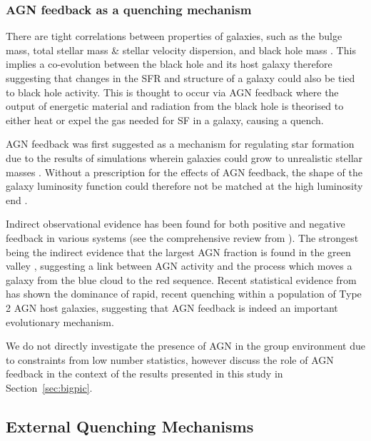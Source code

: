 \documentclass[useAMS,usenatbib]{mn2e}
\begin{document}
\subsubsection{AGN feedback as a quenching mechanism}\label{sec:agnquench}

There are tight correlations between properties of galaxies, such as the bulge mass, total stellar mass \& stellar velocity dispersion, and black hole mass \citep{magorrian98, marconi03, haringrix04}. This implies a co-evolution between the black hole and its host galaxy therefore suggesting that changes in the SFR and structure of a galaxy could also be tied to black hole activity. This is thought to occur via AGN feedback where the output of energetic material and radiation from the black hole is theorised to either heat or expel the gas needed for SF in a galaxy, causing a quench.

AGN feedback was first suggested as a mechanism for regulating star formation due to the results of simulations wherein galaxies could grow to unrealistic stellar masses \citep{silk98, Bower06, Croton06, somerville08}. Without a prescription for the effects of AGN feedback, the shape of the galaxy luminosity function could therefore not be matched at the high luminosity end \citep{baugh98, baugh05, kauffmann99a, kauffmann99b, somerville01, kitzbichler06}. 

Indirect observational evidence has been found for both positive and negative feedback in various systems (see the comprehensive review from \citealt{fabian12}). The strongest being the indirect evidence that the largest AGN fraction is found in the green valley \citep{cowie08, Hickox09, schawinski10a}, suggesting a link between AGN activity and the process which moves a galaxy from the blue cloud to the red sequence. Recent statistical evidence from \cite{smethurst16} has shown the dominance of rapid, recent quenching within a population of Type 2 AGN host galaxies, suggesting that AGN feedback is indeed an important evolutionary mechanism. 

We do not directly investigate the presence of AGN in the group environment due to constraints from low number statistics, however discuss the role of AGN feedback in the context of the results presented in this study in Section~\ref{sec:bigpic}.

 
\subsection{External Quenching Mechanisms}\label{sec:extquench}
\end{document}
